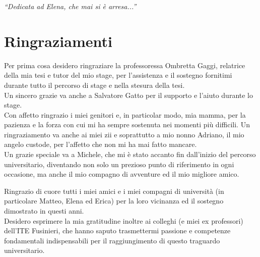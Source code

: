 \cleardoublepage
{}
{}

\begin{flushright}{
    \slshape
    ``Dedicata ad Elena, che mai si è arresa...''} \\
\end{flushright}
\vspace{2.5cm}
\begingroup
\let\clearpage\relax
\let\cleardoublepage\relax

\chapter*{Ringraziamenti}
\noindent\begin{small}Per prima cosa desidero ringraziare la professoressa Ombretta Gaggi, relatrice della mia tesi e tutor del mio stage, per l’assistenza e il sostegno fornitimi durante tutto il percorso di stage e nella stesura della tesi.\\
Un sincero grazie va anche a Salvatore Gatto per il supporto e l’aiuto durante lo stage.\\

\noindent Con affetto ringrazio i miei genitori e, in particolar modo, mia mamma, per la pazienza e la forza con cui mi ha sempre sostenuta nei momenti più difficili. Un ringraziamento va anche ai miei zii e soprattutto a mio nonno Adriano, il mio angelo custode, per l’affetto che non mi ha mai fatto mancare.\\

\noindent Un grazie speciale va a Michele, che mi è stato accanto fin dall’inizio del percorso universitario, diventando non solo un prezioso punto di riferimento in ogni occasione, ma anche il mio compagno di avventure ed il mio migliore amico.

\noindent Ringrazio di cuore tutti i miei amici e i miei compagni di università (in particolare Matteo, Elena ed Erica) per la loro vicinanza ed il sostegno dimostrato in questi anni.\\

\noindent Desidero esprimere la mia gratitudine inoltre ai colleghi (e miei ex professori) dell’ITE Fusinieri, che hanno saputo trasmettermi passione e competenze fondamentali indispensabili per il raggiungimento di questo traguardo universitario.\\
\end{small}
\vspace{0.75cm}

\noindent{\myLocation, \myTime}
\hfill \textit{\myName}

\endgroup